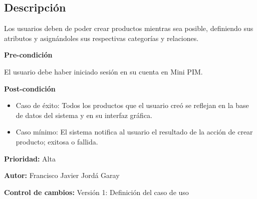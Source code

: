 
\subsection*{Descripción}
Los usuarios deben de poder crear productos mientras sea posible, definiendo sus atributos y asignándoles sus respectivas categorías y relaciones.\par
\vspace{0.15cm}

\textbf{Pre-condición}\par
El usuario debe haber iniciado sesión en su cuenta en Mini PIM.\par
\vspace{0.15cm}

\textbf{Post-condición}
\begin{itemize}
    \item Caso de éxito: Todos los productos que el usuario creó se reflejan en la base de datos del sistema y en su interfaz gráfica.
    \item Caso mínimo: El sistema notifica al usuario el resultado de la acción de crear producto; exitosa o fallida.
\end{itemize}

\textbf{Prioridad: }
Alta
\vspace{0.15cm}

\textbf{Autor: }
Francisco Javier Jordá Garay\par
\vspace{0.15cm}

\textbf{Control de cambios: } Versión 1: Definición del caso de uso

